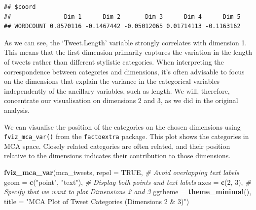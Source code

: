 \documentclass[
]{book}
\newenvironment{Shaded}{\begin{snugshade}}{\end{snugshade}}
\newcommand{\AttributeTok}[1]{\textcolor[rgb]{0.13,0.29,0.53}{#1}}
\newcommand{\CommentTok}[1]{\textcolor[rgb]{0.56,0.35,0.01}{\textit{#1}}}
\newcommand{\ConstantTok}[1]{\textcolor[rgb]{0.56,0.35,0.01}{#1}}
\newcommand{\DecValTok}[1]{\textcolor[rgb]{0.00,0.00,0.81}{#1}}
\newcommand{\FunctionTok}[1]{\textcolor[rgb]{0.13,0.29,0.53}{\textbf{#1}}}
\newcommand{\NormalTok}[1]{#1}
\newcommand{\SpecialCharTok}[1]{\textcolor[rgb]{0.81,0.36,0.00}{\textbf{#1}}}
\newcommand{\StringTok}[1]{\textcolor[rgb]{0.31,0.60,0.02}{#1}}
\begin{document}
\begin{Shaded}
\end{Shaded}

\begin{verbatim}
## $coord
##               Dim 1      Dim 2       Dim 3      Dim 4      Dim 5
## WORDCOUNT 0.8570116 -0.1467442 -0.05012065 0.01714113 -0.1163162
\end{verbatim}

As we can see, the `Tweet.Length' variable strongly correlates with dimension 1. This means that the first dimension primarily captures the variation in the length of tweets rather than different stylistic categories. When interpreting the correspondence between categories and dimensions, it's often advisable to focus on the dimensions that explain the variance in the categorical variables independently of the ancillary variables, such as length. We will, therefore, concentrate our visualisation on dimensions 2 and 3, as we did in the original analysis.

We can visualise the position of the categories on the chosen dimensions using \texttt{fviz\_mca\_var()} from the \texttt{factoextra} package. This plot shows the categories in MCA space. Closely related categories are often related, and their position relative to the dimensions indicates their contribution to those dimensions.

\begin{Shaded}
\begin{Highlighting}[]
\FunctionTok{fviz\_mca\_var}\NormalTok{(mca\_tweets,}
             \AttributeTok{repel =} \ConstantTok{TRUE}\NormalTok{, }\CommentTok{\# Avoid overlapping text labels}
             \AttributeTok{geom =} \FunctionTok{c}\NormalTok{(}\StringTok{"point"}\NormalTok{, }\StringTok{"text"}\NormalTok{), }\CommentTok{\# Display both points and text labels}
             \AttributeTok{axes =} \FunctionTok{c}\NormalTok{(}\DecValTok{2}\NormalTok{, }\DecValTok{3}\NormalTok{), }\CommentTok{\# Specify that we want to plot Dimensions 2 and 3}
             \AttributeTok{ggtheme =} \FunctionTok{theme\_minimal}\NormalTok{(),}
             \AttributeTok{title =} \StringTok{"MCA Plot of Tweet Categories (Dimensions 2 \& 3)"}\NormalTok{)}
\end{Highlighting}
\end{Shaded}
\end{document}
